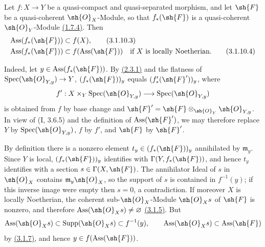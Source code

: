 \begin{remark}[3.1.10.2]
\label{IV.3.1.10.2}
Let $f:X\to Y$ be a quasi-compact and quasi-separated morphism, and let
$\sh{F}$ be a quasi-coherent $\sh{O}_X$-Module, so that $f_*(\sh{F})$
is a quasi-coherent $\sh{O}_Y$-Module {\hyperlink{ega4.c04.statement.1-7-4}{(1.7.4)}}.  Then
\begin{align}
 \operatorname{Ass}(f_*(\sh{F}))&\subset f(X), \label{IV.3.1.10.3}
\tag{3.1.10.3}\\
 \operatorname{Ass}(f_*(\sh{F}))&\subset f(\operatorname{Ass}(\sh{F}))
       \quad\text{if $X$ is locally Noetherian}. \label{IV.3.1.10.4}
\tag{3.1.10.4}
\end{align}

Indeed, let $y\in\operatorname{Ass}(f_*(\sh{F}))$.  By {\hyperlink{ega4.c04.lem.2-3-1}{(2.3.1)}} and the
flatness of $\operatorname{Spec}(\sh{O}_{Y,y})\to Y$,
$(f_*(\sh{F}))_y$ equals $(f'_*(\sh{F}'))_y$, where
\[
 f':X\times_Y\operatorname{Spec}(\sh{O}_{Y,y})
       \longrightarrow\operatorname{Spec}(\sh{O}_{Y,y})
\]
is obtained from $f$ by base change and
$\sh{F}'=\sh{F}\otimes_{\sh{O}_Y}\sh{O}_{Y,y}$.  In view of (I, 3.6.5)
and the definition of $\operatorname{Ass}(\sh{F}')$, we may therefore
replace $Y$ by $\operatorname{Spec}(\sh{O}_{Y,y})$, $f$ by $f'$, and
$\sh{F}$ by $\sh{F}'$.

By definition there is a nonzero element
$t_y\in(f_*(\sh{F}))_y$ annihilated by $\mathfrak m_y$.  Since $Y$ is
local, $(f_*(\sh{F}))_y$ identifies with
$\Gamma(Y,f_*(\sh{F}))$, and hence $t_y$ identifies with a section
$s\in\Gamma(X,\sh{F})$.  The annihilator Ideal of $s$ in $\sh{O}_X$
contains $\mathfrak m_y\sh{O}_X$, so the support of $s$ is contained in
$f^{-1}(y)$; if this inverse image were empty then $s=0$, a
contradiction.  If moreover $X$ is locally Noetherian, the coherent
sub-$\sh{O}_X$-Module $\sh{O}_Xs$ of $\sh{F}$ is nonzero, and therefore
$\operatorname{Ass}(\sh{O}_Xs)\neq\varnothing$ {\hyperlink{ega4.c04.cor.3-1-5}{(3.1.5)}}.  But
\[
 \operatorname{Ass}(\sh{O}_Xs)\subset\operatorname{Supp}(\sh{O}_Xs)
 \subset f^{-1}(y),
 \qquad
 \operatorname{Ass}(\sh{O}_Xs)\subset\operatorname{Ass}(\sh{F})
\]
by {\hyperlink{ega4.c04.prop.3-1-7}{(3.1.7)}}, and hence $y\in f(\operatorname{Ass}(\sh{F}))$.
\end{remark}

